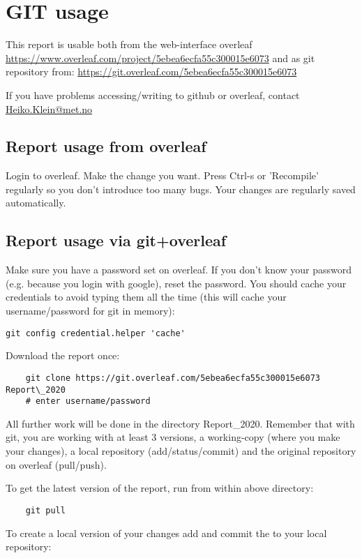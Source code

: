 \chapter{GIT usage}

This report is usable both from the web-interface overleaf \url{https://www.overleaf.com/project/5ebea6ecfa55c300015e6073} and as git repository from: \url{https://git.overleaf.com/5ebea6ecfa55c300015e6073}

If you have problems accessing/writing to github or overleaf, contact \href{mailto:Heiko.Klein@met.no}{Heiko.Klein@met.no}

\section{Report usage from overleaf}

Login to overleaf. Make the change you want. Press Ctrl-s or 'Recompile' regularly so you don't introduce too many bugs. Your changes are regularly saved automatically.

\section{Report usage via git+overleaf}

Make sure you have a password set on overleaf. If you don't know your password (e.g. because you login with google), reset the password. You should cache your credentials to avoid typing them all the time (this will cache your username/password for git in memory):
\begin{verbatim}
git config credential.helper 'cache'
\end{verbatim}


Download the report once:
\begin{verbatim}
    git clone https://git.overleaf.com/5ebea6ecfa55c300015e6073 Report\_2020
    # enter username/password
\end{verbatim}
All further work will be done in the directory Report\_2020. Remember that with git, you are working with at least 3 versions, a working-copy (where you make your changes), a local repository (add/status/commit) and the original repository on overleaf (pull/push).

To get the latest version of the report, run from within above directory:
\begin{verbatim}
    git pull
\end{verbatim}

To create a local version of your changes add and commit the to your local repository:

